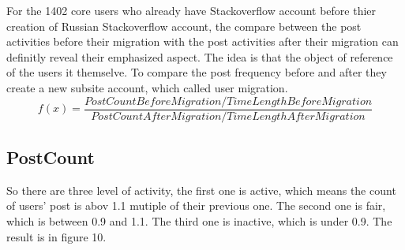 \documentclass[A4paper,twoside,twocolumn]{article}
\begin{document}
For the 1402 core users who already have Stackoverflow account before thier creation of Russian Stackoverflow account, the compare between the post activities before their migration with the post activities after their migration can definitly reveal their emphasized aspect.	The idea is that the object of reference of the users it themselve. To compare the post frequency before and after they create a new subsite account, which called user migration.
	\begin{displaymath}
	f(x)=\frac{PostCountBeforeMigration /TimeLengthBeforeMigration}{PostCountAfterMigration/TimeLengthAfterMigration}	 			\end{displaymath}

\subsection{PostCount}
So there are three level of activity, the first one is active, which means the count of users' post is abov 1.1 mutiple of their previous one. The second one is fair, which is between 0.9 and 1.1. The third one is inactive, which is under 0.9. The result is in figure 10.
\end{document}
